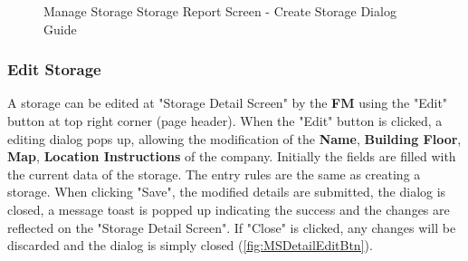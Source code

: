\begin{figure}[H]
    \vspace{10pt}
    
    \caption{Manage Storage Storage Report Screen - Create Storage Dialog Guide}
	\label{fig:MSreportCreateGuide}
\end{figure}


\subsubsection{Edit Storage}

A storage can be edited at "Storage Detail Screen" by the \textbf{FM} using the "Edit" button at top right corner (page header). 
When the "Edit" button is clicked, a editing dialog pops up, allowing the modification of the \textbf{Name}, \textbf{Building Floor}, \textbf{Map}, \textbf{Location Instructions} of the company. Initially the fields are filled with the current data of the storage. The entry rules are the same as creating a storage.
When clicking "Save", the modified details are submitted, the dialog is closed, a message toast is popped up indicating the success and the changes are reflected on the "Storage Detail Screen". If "Close" is clicked, any changes will be discarded and the dialog is simply closed (\autoref{fig:MSDetailEditBtn}).


